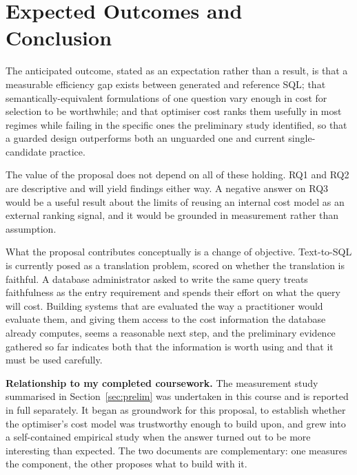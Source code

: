 \documentclass[12pt, a4paper]{article}
\begin{document}
\section{Expected Outcomes and Conclusion}
\label{sec:conclusion}

The anticipated outcome, stated as an expectation rather than a result,
is that a measurable efficiency gap exists between generated and
reference SQL; that semantically-equivalent formulations of one question
vary enough in cost for selection to be worthwhile; and that optimiser
cost ranks them usefully in most regimes while failing in the specific
ones the preliminary study identified, so that a guarded design
outperforms both an unguarded one and current single-candidate practice.

The value of the proposal does not depend on all of these holding. RQ1
and RQ2 are descriptive and will yield findings either way. A negative
answer on RQ3 would be a useful result about the limits of reusing an
internal cost model as an external ranking signal, and it would be
grounded in measurement rather than assumption.

What the proposal contributes conceptually is a change of objective.
Text-to-SQL is currently posed as a translation problem, scored on
whether the translation is faithful. A database administrator asked to
write the same query treats faithfulness as the entry requirement and
spends their effort on what the query will cost. Building systems that
are evaluated the way a practitioner would evaluate them, and giving
them access to the cost information the database already computes, seems
a reasonable next step, and the preliminary evidence gathered so far
indicates both that the information is worth using and that it must be
used carefully.

\vspace{0.8em}
\noindent
\textbf{Relationship to my completed coursework.} The measurement study
summarised in Section~\ref{sec:prelim} was undertaken in this course and
is reported in full separately. It began as groundwork for this
proposal, to establish whether the optimiser's cost model was
trustworthy enough to build upon, and grew into a self-contained
empirical study when the answer turned out to be more interesting than
expected. The two documents are complementary: one measures the
component, the other proposes what to build with it.

\newpage
\printbibliography[heading=bibnumbered, title={References}]
\end{document}

